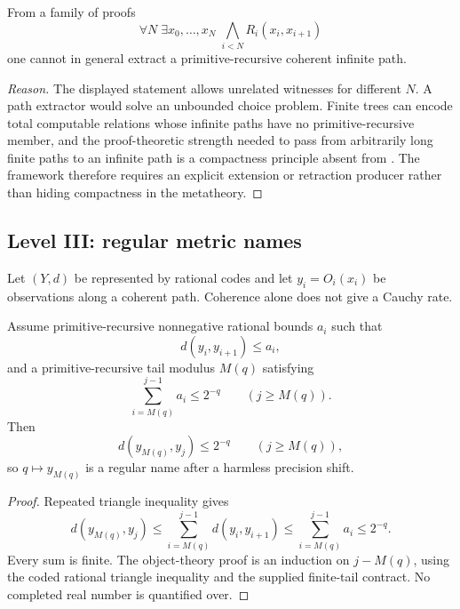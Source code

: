\begin{barrier}\label{barrier:horizon-path}
From a family of proofs
\[
       \forall N\;\exists x_0,\ldots,x_N\;\bigwedge_{i<N}R_i(x_i,x_{i+1})
\]
one cannot in general extract a primitive-recursive coherent infinite path.
\end{barrier}

\begin{proof}[Reason]
The displayed statement allows unrelated witnesses for different \(N\).  A path extractor would solve an unbounded choice problem.  Finite trees can encode total computable relations whose infinite paths have no primitive-recursive member, and the proof-theoretic strength needed to pass from arbitrarily long finite paths to an infinite path is a compactness principle absent from \iPRA.  The framework therefore requires an explicit extension or retraction producer rather than hiding compactness in the metatheory.
\end{proof}

\subsection{Level III: regular metric names}

Let \((Y,d)\) be represented by rational codes and let \(y_i=O_i(x_i)\) be observations along a coherent path.  Coherence alone does not give a Cauchy rate.

\begin{theorem}\label{thm:regular-name}
Assume primitive-recursive nonnegative rational bounds \(a_i\) such that
\[
       d(y_i,y_{i+1})\le a_i,
\]
and a primitive-recursive tail modulus \(M(q)\) satisfying
\[
       \sum_{i=M(q)}^{j-1}a_i\le 2^{-q}
       \qquad(j\ge M(q)).
\]
Then
\[
       d(y_{M(q)},y_j)\le 2^{-q}
       \qquad(j\ge M(q)),
\]
so \(q\mapsto y_{M(q)}\) is a regular name after a harmless precision shift.
\end{theorem}

\begin{proof}
Repeated triangle inequality gives
\[
 d(y_{M(q)},y_j)
 \le \sum_{i=M(q)}^{j-1}d(y_i,y_{i+1})
 \le \sum_{i=M(q)}^{j-1}a_i
 \le 2^{-q}.
\]
Every sum is finite.  The object-theory proof is an induction on \(j-M(q)\), using the coded rational triangle inequality and the supplied finite-tail contract.  No completed real number is quantified over.
\end{proof}

